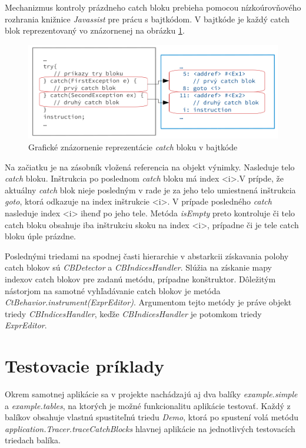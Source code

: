 \documentclass[11pt,final,oneside]{fithesis}
\begin{document}
Mechanizmus kontroly prázdneho catch bloku prebieha pomocou nízkoúrovňového rozhrania knižnice \textit{Javassist} pre prácu s bajtkódom. V bajtkóde je každý catch blok reprezentovaný vo znázornenej na obrázku \ref{fig:catch}.

\begin{figure}[h]
  \centering
   \includegraphics[width=\textwidth]{catch.png}
  \caption{Grafické znázornenie reprezentácie \textit{catch} bloku v bajtkóde}
  \label{fig:catch}
\end{figure}

Na začiatku je na zásobník vložená referencia na objekt výnimky. Nasleduje telo \textit{catch} bloku. Inštrukcia po poslednom \textit{catch} bloku má index <i>.V prípde, že aktuálny \textit{catch} blok nieje posledným v rade je za jeho telo umiestnená inštrukcia \textit{goto}, ktorá odkazuje na index inštrukcie <i>. V prípade posledného \textit{catch} nasleduje index <i> ihenď po jeho tele.
Metóda \textit{isEmpty} preto kontroluje či telo catch bloku obsahuje iba inštrukciu skoku na index <i>, prípadne či je tele catch bloku úple prázdne. 

Poslednými triedami na spodnej časti hierarchie v abstarkcii získavania polohy catch blokov sú \textit{CBDetector} a \textit{CBIndicesHandler}. Slúžia na získanie mapy indexov catch blokov pre zadanú metódu, prípadne konštruktor. Dôležitým nástorjom na samotné vyhľadávanie catch blokov je metóda \textit{CtBehavior.instrument(ExprEditor)}. Argumentom tejto metódy je práve objekt triedy \textit{CBIndicesHandler}, keďže \textit{CBIndicesHandler} je potomkom triedy \textit{ExprEditor}.

\section{Testovacie príklady}

Okrem samotnej aplikácie sa v projekte nachádzajú aj dva balíky \textit{example.simple} a \textit{example.tables}, na ktorých je možné funkcionalitu aplikácie testovať. Každý z balíkov obsahuje vlastnú spustiteľnú triedu \textit{Demo}, ktorá po spustení volá metódu \textit{application.Tracer.traceCatchBlocks} hlavnej aplikácie na jednotlivých testovacích triedach balíka. 
\end{document}
